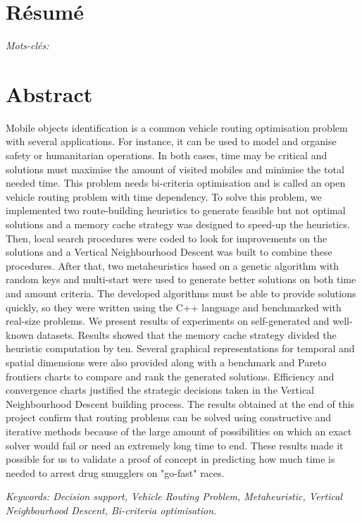 \section*{Résumé}


\emph{Mots-clés: }

\section*{Abstract}

Mobile objects identification is a common vehicle routing optimisation problem with several applications. For instance, it can be used to model and organise safety or humanitarian operations. In both cases, time may be critical and solutions must maximise the amount of visited mobiles and minimise the total needed time. This problem needs bi-criteria optimisation and is called an open vehicle routing problem with time dependency. To solve this problem, we implemented two route-building heuristics to generate feasible but not optimal solutions and a memory cache strategy was designed to speed-up the heuristics. Then, local search procedures were coded to look for improvements on the solutions and a Vertical Neighbourhood Descent was built to combine these procedures. After that, two metaheuristics based on a genetic algorithm with random keys and multi-start were used to generate better solutions on both time and amount criteria. The developed algorithms must be able to provide solutions quickly, so they were written using the C++ language and benchmarked with real-size problems. We present results of experiments on self-generated and well-known datasets. Results showed that the memory cache strategy divided the heuristic computation by ten. Several graphical representations for temporal and spatial dimensions were also provided along with a benchmark and Pareto frontiers charts to compare and rank the generated solutions. Efficiency and convergence charts justified the strategic decisions taken in the Vertical Neighbourhood Descent building process. The results obtained at the end of this project confirm that routing problems can be solved using constructive and iterative methods because of the large amount of possibilities on which an exact solver would fail or need an extremely long time to end. These results made it possible for us to validate a proof of concept in predicting how much time is needed to arrest drug smugglers on "go-fast" races.

\emph{Keywords: Decision support, Vehicle Routing Problem, Metaheuristic, Vertical Neighbourhood Descent, Bi-criteria optimisation.}